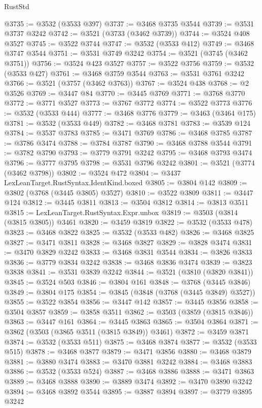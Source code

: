 \begin{lexlean}{RustStd}
\begin{coremodule}
@3735 := @3532 (@3533 @397)
@3737 := @3468 @3735 @3544
@3739 := @3531 @3737 @3242
@3742 := @3521 (@3733 (@3462 @3739))
@3744 := @3524 @408 @3527
@3745 := @3522 @3744
@3747 := @3532 (@3533 @412)
@3749 := @3468 @3747 @3544
@3751 := @3531 @3749 @3242
@3754 := @3521 (@3745 (@3462 @3751))
@3756 := @3524 @423 @3527
@3757 := @3522 @3756
@3759 := @3532 (@3533 @427)
@3761 := @3468 @3759 @3544
@3763 := @3531 @3761 @3242
@3766 := @3521 (@3757 (@3462 @3763))
@3767 := @3524 @438
@3768 := @2 @3526
@3769 := @3447 @84
@3770 := @3445 @3769
@3771 := @3768 @3770
@3772 := @3771 @3527
@3773 := @3767 @3772
@3774 := @3522 @3773
@3776 := @3532 (@3533 @444)
@3777 := @3468 @3776
@3779 := @3463 (@3464 @175)
@3781 := @3532 (@3533 @449)
@3782 := @3468 @3781
@3783 := @3539 @124
@3784 := @3537 @3783
@3785 := @3471 @3769
@3786 := @3468 @3785
@3787 := @3786 @3474
@3788 := @3784 @3787
@3790 := @3468 @3788 @3544
@3791 := @3782 @3790
@3793 := @3779 @3791 @3242
@3795 := @3468 @3793 @3474
@3796 := @3777 @3795
@3798 := @3531 @3796 @3242
@3801 := @3521 (@3774 (@3462 @3798))
@3802 := @3524 @472
@3804 := @3437 LexLeanTarget.RustSyntax.IdentKind.boxed
@3805 := @3804 @142
@3809 := @3802 (@3768 (@3445 @3805) @3527)
@3810 := @3522 @3809
@3811 := @3447 @124
@3812 := @3445 @3811
@3813 := @3504 @3812
@3814 := @3813 @3511
@3815 := LexLeanTarget.RustSyntax.Expr.unbox
@3819 := @3503 (@3814 (@3815 @3805)) @3461
@3820 := @3459 @3819
@3822 := @3532 (@3533 @478)
@3823 := @3468 @3822
@3825 := @3532 (@3533 @482)
@3826 := @3468 @3825
@3827 := @3471 @3811
@3828 := @3468 @3827
@3829 := @3828 @3474
@3831 := @3470 @3829 @3242
@3833 := @3468 @3831 @3544
@3834 := @3826 @3833
@3836 := @3779 @3834 @3242
@3838 := @3468 @3836 @3474
@3839 := @3823 @3838
@3841 := @3531 @3839 @3242
@3844 := @3521 (@3810 (@3820 @3841))
@3845 := @3524 @503
@3846 := @3804 @161
@3848 := @3768 (@3445 @3846)
@3849 := @3804 @175
@3854 := @3845 (@3848 (@3768 (@3445 @3849) @3527))
@3855 := @3522 @3854
@3856 := @3447 @142
@3857 := @3445 @3856
@3858 := @3504 @3857
@3859 := @3858 @3511
@3862 := @3503 (@3859 (@3815 @3846))
@3863 := @3447 @161
@3864 := @3445 @3863
@3865 := @3504 @3864
@3871 := @3862 (@3503 (@3865 @3511 (@3815 @3849)) @3461)
@3872 := @3459 @3871
@3874 := @3532 (@3533 @511)
@3875 := @3468 @3874
@3877 := @3532 (@3533 @515)
@3878 := @3468 @3877
@3879 := @3471 @3856
@3880 := @3468 @3879
@3881 := @3880 @3474
@3883 := @3470 @3881 @3242
@3884 := @3468 @3883
@3886 := @3532 (@3533 @524)
@3887 := @3468 @3886
@3888 := @3471 @3863
@3889 := @3468 @3888
@3890 := @3889 @3474
@3892 := @3470 @3890 @3242
@3894 := @3468 @3892 @3544
@3895 := @3887 @3894
@3897 := @3779 @3895 @3242

\end{coremodule}
\end{lexlean}
